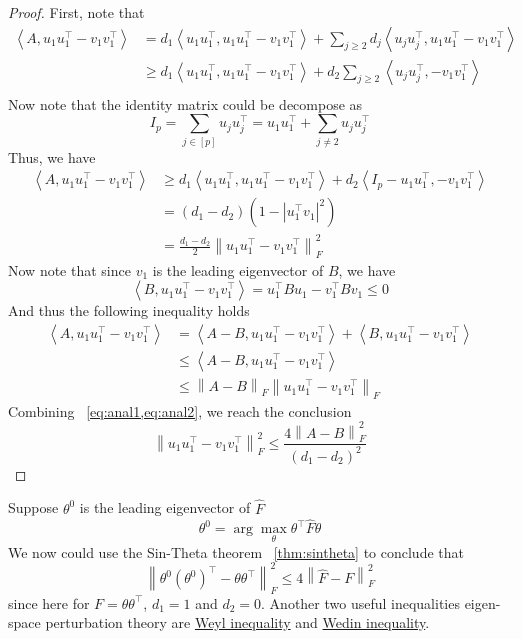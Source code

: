 \documentclass[12pt]{article}
\newcommand{\bra}[1]{\left(#1\right)}
\newcommand{\abs}[1]{\left|#1\right|}
\newcommand{\innprod}[1]{\left\langle#1\right\rangle}
\newcommand{\norm}[1]{\left\|#1\right\|}
\newcommand{\wh}[1]{\widehat{#1}}
\def\beq{\begin{equation}}
\def\eeq{\end{equation}}
\def\beqal{\begin{equation}\begin{aligned}}
\def\eeqal{\end{aligned}\end{equation}}
\begin{document}
\begin{proof}
First, note that
\beqal
\innprod{A,u_1u_1^\top-v_1v_1^\top}&=d_1\innprod{u_1u_1^\top, u_1u_1^\top-v_1v_1^\top}+\sum_{j\geq 2}d_j\innprod{u_ju_j^\top, u_1u_1^\top-v_1v_1^\top}\\
&\geq d_1\innprod{u_1u_1^\top, u_1u_1^\top-v_1v_1^\top}+d_2\sum_{j\geq 2}\innprod{u_ju_j^\top, -v_1v_1^\top}\\
\eeqal
Now note that the identity matrix could be decompose as
\beq
I_p=\sum_{j\in[p]}u_ju_j^\top=u_1u_1^\top +\sum_{j\not = 2}u_ju_j^\top 
\eeq
Thus, we have
\beqal\label{eq:anal1}
\innprod{A,u_1u_1^\top-v_1v_1^\top}&\geq d_1\innprod{u_1u_1^\top, u_1u_1^\top-v_1v_1^\top}+d_2\innprod{I_p-u_1u_1^\top, -v_1v_1^\top}\\
&=\bra{d_1-d_2}\bra{1-\abs{u_1^\top v_1}^2}\\
&=\frac{d_1-d_2}{2}\norm{u_1u_1^\top-v_1v_1^\top}_F^2
\eeqal
Now note that since $v_1$ is the leading eigenvector of $B$, we have
\beq
\innprod{B,u_1u_1^\top-v_1v_1^\top}=u_1^\top Bu_1-v_1^\top Bv_1\leq 0
\eeq
And thus the following inequality holds
\beqal\label{eq:anal2}
\innprod{A, u_1u_1^\top-v_1v_1^\top}&=\innprod{A-B,u_1u_1^\top-v_1v_1^\top}+\innprod{B,u_1u_1^\top-v_1v_1^\top}\\
&\leq \innprod{A-B,u_1u_1^\top-v_1v_1^\top}\\
&\leq \norm{A-B}_F\norm{u_1u_1^\top-v_1v_1^\top}_F
\eeqal
Combining ~\cref{eq:anal1,eq:anal2}, we reach the conclusion
\beq
\norm{u_1u_1^\top - v_1v_1^\top}_F^2\leq \frac{4\norm{A-B}_F^2}{\bra{d_1-d_2}^2}
\eeq
\end{proof}
Suppose $\theta^0$ is the leading eigenvector of $\wh{F}$
\beq
\theta^0=\arg\max_\theta \theta^\top \wh{F}\theta
\eeq
We now could use the Sin-Theta theorem ~\ref{thm:sintheta} to conclude that
\beq
\norm{\theta^0\bra{\theta^0}^\top-\theta\theta^\top}_F^2\leq 4\norm{\wh{F}-F}_F^2
\eeq
since here for $F=\theta\theta^\top$, $d_1=1$ and $d_2=0$. Another two useful inequalities eigen-space perturbation theory are \href{https://terrytao.wordpress.com/2010/01/12/254a-notes-3a-eigenvalues-and-sums-of-hermitian-matrices/}{Weyl inequality} and \href{https://www.princeton.edu/~yc5/ele538_math_data/lectures/spectral_method.pdf}{Wedin inequality}.
%



	
\end{document}

